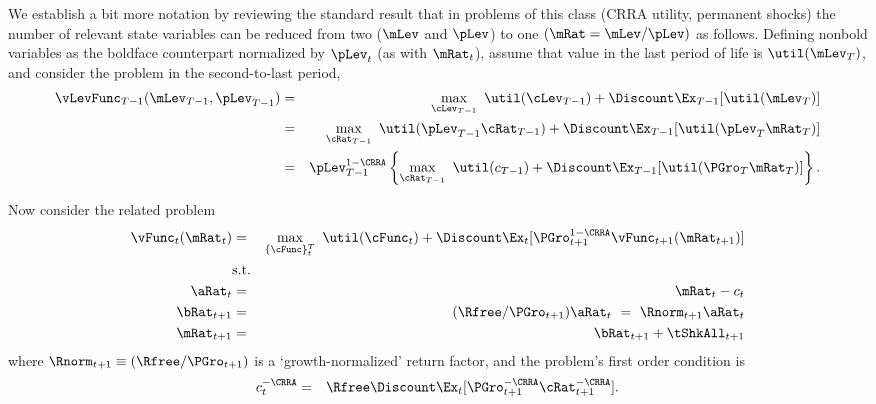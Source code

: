 \documentclass[titlepage]{\econtex}\providecommand{\texname}{BufferStockTheory}%
\providecommand{\EqDir}{Equations}
\begin{document}
We establish a bit more notation by reviewing the standard result that in problems of this class (CRRA utility, permanent shocks) the number of relevant state variables can be reduced from two ($\mLev$ and $\pLev$) to one $(\mRat = \mLev/\pLev)$ as follows.  Defining nonbold variables as the boldface counterpart normalized by $\pLev_{t}$ (as with $\mRat_{t}$), assume that value in the last period of life is $\util(\mLev_{T})$, and consider the problem in the second-to-last period,
\begin{eqnarray}
\vLevFunc_{T-1}(\mLev_{T-1},\pLev_{T-1}) &=&
\max_{\cLev_{T-1}}~ \util(\cLev_{T-1}) +\Discount \Ex_{T-1} [ \util(\mLev_{T})]
\notag \\
& = &  \max_{\cRat_{T-1}}~
\util(\pLev_{T-1}\cRat_{T-1}) + \Discount  \Ex_{T-1} [\util(\pLev_{T}{\mRat}
_{T})]  \notag \\
& = & \pLev_{T-1}^{1-\CRRA}
\left\{\max_{\cRat_{T-1}}~ \util(c_{T-1}) + \Discount \Ex_{T-1} [ \util( {\PGro}_{T}
{\mRat}_{T}) ] \right\}  . \label{eq:vBold}
\end{eqnarray}


Now consider the related problem
\begin{eqnarray}
\vFunc_{t}(\mRat_{t}) & = & \max_{\{\cFunc\}_{t}^{T}}~  \util(\cFunc_{t}) +\Discount \Ex_{t}[\PGro_{t+1}^{1-\CRRA}\vFunc_{t+1}({\mRat}_{t+1})] \label{eq:veqn}  \\
& \mbox{s.t.} &  \notag 
 \\ {\aRat}_{t} & = & \mRat_{t}-c_{t}  \label{eq:smalls} \notag
 \\ {\bRat}_{t+1} & = & (\Rfree/\PGro_{t+1})\aRat_{t}  ~ = ~ \Rnorm_{t+1}\aRat_{t}  \notag \label{eq:smallb}
\\ \mRat_{t+1} & = & \bRat_{t+1}+\tShkAll_{t+1}  \notag %
\end{eqnarray}
where $\Rnorm_{t+1}\equiv (\Rfree/\PGro_{t+1})$ is a `growth-normalized' return factor, and the problem's first order condition is
\begin{eqnarray}
c_{t}^{-\CRRA} & = & \Rfree \Discount \Ex_{t}[ {\PGro}_{t+1}^{-\CRRA} {\cRat}
_{t+1}^{-\CRRA}].  \label{eq:scaledeuler}
\end{eqnarray}
\end{document}
